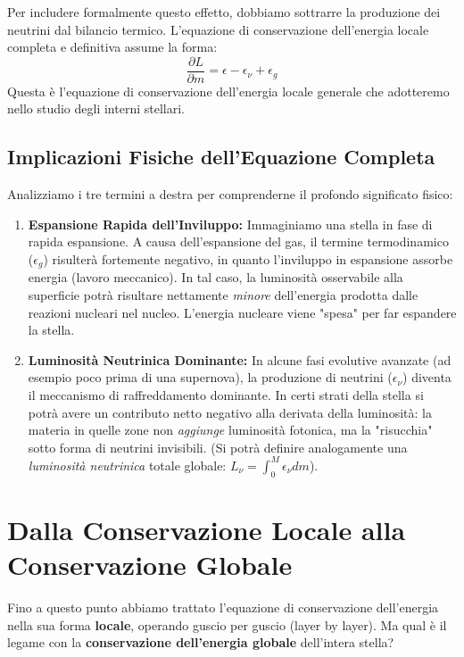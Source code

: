 Per includere formalmente questo effetto, dobbiamo sottrarre la produzione dei neutrini dal bilancio termico. L'equazione di conservazione dell'energia locale completa e definitiva assume la forma:
\begin{equation}
\frac{\partial L}{\partial m} = \epsilon - \epsilon_\nu + \epsilon_g
\end{equation}
Questa è l'equazione di conservazione dell'energia locale generale che adotteremo nello studio degli interni stellari.

\subsection{Implicazioni Fisiche dell'Equazione Completa}

Analizziamo i tre termini a destra per comprenderne il profondo significato fisico:
\begin{enumerate}
\item \textbf{Espansione Rapida dell'Inviluppo:} Immaginiamo una stella in fase di rapida espansione. A causa dell'espansione del gas, il termine termodinamico ($\epsilon_g$) risulterà fortemente negativo, in quanto l'inviluppo in espansione assorbe energia (lavoro meccanico). In tal caso, la luminosità osservabile alla superficie potrà risultare nettamente \textit{minore} dell'energia prodotta dalle reazioni nucleari nel nucleo. L'energia nucleare viene "spesa" per far espandere la stella.
\item \textbf{Luminosità Neutrinica Dominante:} In alcune fasi evolutive avanzate (ad esempio poco prima di una supernova), la produzione di neutrini ($\epsilon_\nu$) diventa il meccanismo di raffreddamento dominante. In certi strati della stella si potrà avere un contributo netto negativo alla derivata della luminosità: la materia in quelle zone non \textit{aggiunge} luminosità fotonica, ma la "risucchia" sotto forma di neutrini invisibili. (Si potrà definire analogamente una \textit{luminosità neutrinica} totale globale: $L_\nu = \int_0^M \epsilon_\nu dm$).
\end{enumerate}

\section{Dalla Conservazione Locale alla Conservazione Globale}

Fino a questo punto abbiamo trattato l'equazione di conservazione dell'energia nella sua forma \textbf{locale}, operando guscio per guscio (layer by layer). Ma qual è il legame con la \textbf{conservazione dell'energia globale} dell'intera stella?

